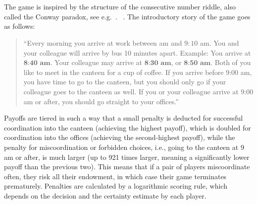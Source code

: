 \section{}\label{sect:canteen}
 The game is inspired by the structure of the consecutive number riddle, also called the Conway paradox, see e.g.\ \cite{van1980conway,van2015one}. ~\cite{meijering2010facilitative, wason1971natural}. The introductory story of the game goes as follows: 
\begin{quote}
\indent
``Every morning you arrive at work between  am and $9{:}10$ am. You and your colleague will arrive by bus 10 minutes apart. Example: You arrive at $\textbf{8:40 am}$. Your colleague may arrive at $\textbf{8:30  am}$, or $\textbf{8:50 am}$. Both of you like to meet in the canteen for a cup of coffee. If you arrive before 9:00 am, you have time to go to the canteen, but you should only go if your colleague goes to the canteen as well. If you or your colleague arrive at 9:00 am or after, you should go straight to your offices.''
\end{quote}
  Payoffs are tiered in such a way that a small penalty is deducted for successful coordination into the canteen (achieving the highest payoff), which is doubled for coordination into the offices (achieving the second-highest payoff), while the penalty for miscoordination or forbidden choices, i.e., going to the canteen at 9 am or after, is much larger (up to 921 times larger, meaning a significantly lower payoff than the previous two). This means that if a pair of players miscoordinate often, they risk  all their endowment, in which case their game terminates prematurely. Penalties are calculated by a logarithmic scoring rule, which depends on the decision and the certainty estimate by each player.

